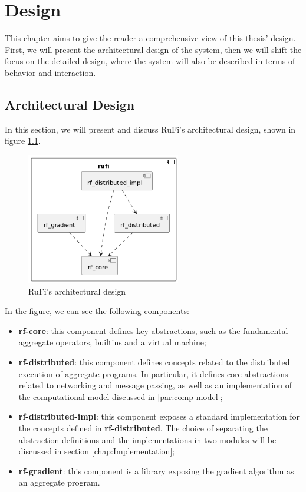 
\chapter{Design}
\label{chap:design}
This chapter aims to give the reader a comprehensive view of this thesis' design. First, we will present the architectural design of the system, then we will shift the focus on
the detailed design, where the system will also be described in terms of behavior and interaction.

\section{Architectural Design}
\label{sec:architectural-design}
In this section, we will present and discuss RuFi's architectural design, shown in figure \ref{fig:rufi-architecture}.

\begin{figure}[ht!]
    \centering
    \includegraphics[width=0.6\textwidth]{figures/diagrams/img/rufi-architecture.png}
    \caption{RuFi's architectural design}
    \label{fig:rufi-architecture}
\end{figure}

In the figure, we can see the following components:

\begin{itemize}
    \item \textbf{rf-core}: this component defines key abstractions, such as the fundamental aggregate operators, builtins and a virtual machine;
    \item \textbf{rf-distributed}: this component defines concepts related to the distributed execution of aggregate programs.
          In particular, it defines core abstractions related to networking and message passing, as well as an implementation of the computational model discussed in \ref{par:comp-model};
    \item \textbf{rf-distributed-impl}: this component exposes a standard implementation for the concepts defined in \textbf{rf-distributed}.
          The choice of separating the abstraction definitions and the implementations in two modules will be discussed in section \ref{chap:Implementation};
    \item \textbf{rf-gradient}: this component is a library exposing the gradient algorithm as an aggregate program.
\end{itemize}

